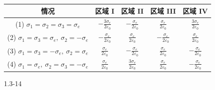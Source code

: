 \documentclass{article}
\begin{document}
\begin{table}[ht]
\centering
\begin{tabular}{|c|c|c|c|c|}
\hline
情况 & 区域 I & 区域 II & 区域 III & 区域 IV \\
\hline
(1) $\sigma_1=\sigma_2=\sigma_3=\sigma_e$ & $-\frac{3\sigma_e}{2\varepsilon_0}$ & $-\frac{\sigma_e}{2\varepsilon_0}$ & $\frac{\sigma_e}{2\varepsilon_0}$ & $\frac{3\sigma_e}{2\varepsilon_0}$ \\
\hline
(2) $\sigma_1=\sigma_3=\sigma_e,\ \sigma_2=-\sigma_e$ & $-\frac{\sigma_e}{2\varepsilon_0}$ & $\frac{\sigma_e}{2\varepsilon_0}$ & $-\frac{\sigma_e}{2\varepsilon_0}$ & $\frac{\sigma_e}{2\varepsilon_0}$ \\
\hline
(3) $\sigma_1=\sigma_3=-\sigma_e,\ \sigma_2=\sigma_e$ & $\frac{\sigma_e}{2\varepsilon_0}$ & $-\frac{\sigma_e}{2\varepsilon_0}$ & $\frac{\sigma_e}{2\varepsilon_0}$ & $-\frac{\sigma_e}{2\varepsilon_0}$ \\
\hline
(4) $\sigma_1=\sigma_e,\ \sigma_2=\sigma_3=-\sigma_e$ & $\frac{\sigma_e}{2\varepsilon_0}$ & $\frac{3\sigma_e}{2\varepsilon_0}$ & $\frac{\sigma_e}{2\varepsilon_0}$ & $-\frac{\sigma_e}{2\varepsilon_0}$ \\
\hline
\end{tabular}
\end{table}



\newpage



1.3-14
\end{document}
